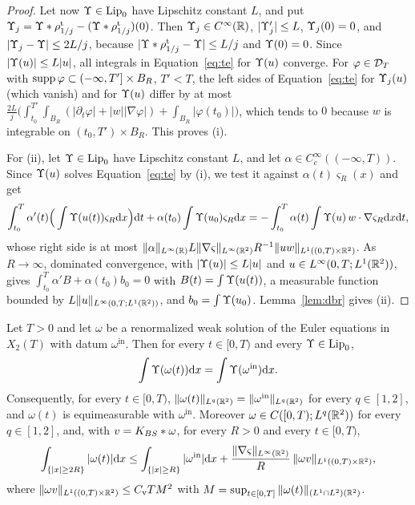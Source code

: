 \begin{proof}
Let now $\Upsilon\in\mathrm{Lip}_0$ have Lipschitz constant $L$, and put
$\Upsilon_j=\Upsilon\ast\rho^{\mathrm t}_{1/j}-(\Upsilon\ast\rho^{\mathrm t}_{1/j})(0)$.
Then $\Upsilon_j\in C^\infty(\mathbb{R})$, $|\Upsilon_j'|\le L$, $\Upsilon_j(0)=0$, and
$|\Upsilon_j-\Upsilon|\le2L/j$, because $|\Upsilon\ast\rho^{\mathrm t}_{1/j}-\Upsilon|\le L/j$
and $\Upsilon(0)=0$. Since $|\Upsilon(u)|\le L|u|$, all integrals in
Equation~\eqref{eq:te} for $\Upsilon(u)$ converge. For $\varphi\in\mathcal{D}_T$ with
$\operatorname{supp}\varphi\subset(-\infty,T']\times B_R$, $T'<T$, the left sides of
Equation~\eqref{eq:te} for $\Upsilon_j(u)$ (which vanish) and for $\Upsilon(u)$ differ
by at most
$\frac{2L}{j}\big(\int_{t_0}^{T'}\!\int_{B_R}(|\partial_t\varphi|+|w||\nabla\varphi|)+\int_{B_R}|\varphi(t_0)|\big)$,
which tends to $0$ because $w$ is integrable on $(t_0,T')\times B_R$. This
proves (i).

For (ii), let $\Upsilon\in\mathrm{Lip}_0$ have Lipschitz constant $L$, and let
$\alpha\in C_c^\infty((-\infty,T))$. Since $\Upsilon(u)$ solves
Equation~\eqref{eq:te} by (i), we test it against $\alpha(t)\varsigma_R(x)$ and get
\[
\int_{t_0}^T\alpha'(t)\Big(\int\Upsilon(u(t))\varsigma_R\dd x\Big)\dd t
+\alpha(t_0)\int\Upsilon(u_0)\varsigma_R\dd x
=-\int_{t_0}^T\alpha(t)\int\Upsilon(u)\,w\cdot\nabla\varsigma_R\dd x\dd t ,
\]
whose right side is at most
$\|\alpha\|_{L^\infty(\mathbb{R})}L\|\nabla\varsigma\|_{L^\infty(\mathbb{R}^2)}R^{-1}\|uw\|_{L^1((0,T)\times\mathbb{R}^2)}$.
As $R\to\infty$, dominated convergence, with $|\Upsilon(u)|\le L|u|$ and
$u\in L^\infty(0,T;L^1(\mathbb{R}^2))$, gives $\int_{t_0}^T\alpha'B+\alpha(t_0)b_0=0$ with
$B(t)=\int\Upsilon(u(t))$, a measurable function bounded by
$L\|u\|_{L^\infty(0,T;L^1(\mathbb{R}^2))}$, and $b_0=\int\Upsilon(u_0)$. Lemma~\ref{lem:dbr} gives
(ii).
\end{proof}

\begin{lemma}
\label{lem:renorm-all-t}
Let $T>0$ and let $\omega$ be a renormalized weak solution of the Euler
equations in $X_2(T)$ with datum $\omega^{\mathrm{in}}$. Then for every
$t\in[0,T)$ and every $\Upsilon\in\mathrm{Lip}_0$,
\begin{equation}
\label{eq:conservation}
\int\Upsilon(\omega(t))\dd x=\int\Upsilon(\omega^{\mathrm{in}})\dd x .
\end{equation}
Consequently, for every $t\in[0,T)$,
$\|\omega(t)\|_{L^q(\mathbb{R}^2)}=\|\omega^{\mathrm{in}}\|_{L^q(\mathbb{R}^2)}$ for every $q\in[1,2]$, and
$\omega(t)$ is equimeasurable with $\omega^{\mathrm{in}}$. Moreover
$\omega\in C([0,T);L^q(\mathbb{R}^2))$ for every $q\in[1,2]$, and, with
$v=K_{BS}\ast\omega$, for every $R>0$ and every $t\in[0,T)$,
\begin{equation}
\label{eq:tail}
\int_{\{|x|\ge2R\}}|\omega(t)|\dd x\le\int_{\{|x|\ge R\}}|\omega^{\mathrm{in}}|\dd x
+\frac{\|\nabla\varsigma\|_{L^\infty(\mathbb{R}^2)}}{R}\,\|\omega v\|_{L^1((0,T)\times\mathbb{R}^2)} ,
\end{equation}
where $\|\omega v\|_{L^1((0,T)\times\mathbb{R}^2)}\le C_{\mathrm v}TM^2$ with
$M=\sup_{t\in[0,T]}\|\omega(t)\|_{(L^1\cap L^2)(\mathbb{R}^2)}$.
\end{lemma}

